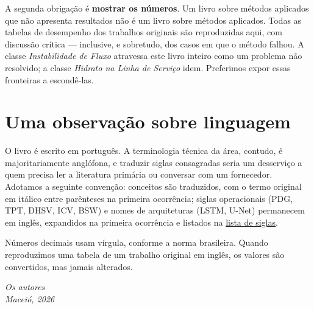 A segunda obrigação é \textbf{mostrar os números}. Um livro sobre métodos aplicados
que não apresenta resultados não é um livro sobre métodos aplicados. Todas as tabelas
de desempenho dos trabalhos originais são reproduzidas aqui, com discussão crítica ---
inclusive, e sobretudo, dos casos em que o método falhou. A classe \emph{Instabilidade
de Fluxo} atravessa este livro inteiro como um problema não resolvido; a classe
\emph{Hidrato na Linha de Serviço} idem. Preferimos expor essas fronteiras a
escondê-las.

\section*{Uma observação sobre linguagem}

O livro é escrito em português. A terminologia técnica da área, contudo, é
majoritariamente anglófona, e traduzir siglas consagradas seria um desserviço a quem
precisa ler a literatura primária ou conversar com um fornecedor. Adotamos a seguinte
convenção: conceitos são traduzidos, com o termo original em itálico entre parênteses
na primeira ocorrência; siglas operacionais (PDG, TPT, DHSV, ICV, BSW) e nomes de
arquiteturas (LSTM, U-Net) permanecem em inglês, expandidos na primeira ocorrência e
listados na \hyperref[cap:siglas]{lista de siglas}.

Números decimais usam vírgula, conforme a norma brasileira. Quando reproduzimos uma
tabela de um trabalho original em inglês, os valores são convertidos, mas jamais
alterados.

\vspace{1.5em}
\noindent\hfill\emph{Os autores}\\
\noindent\hfill\emph{Maceió, 2026}
